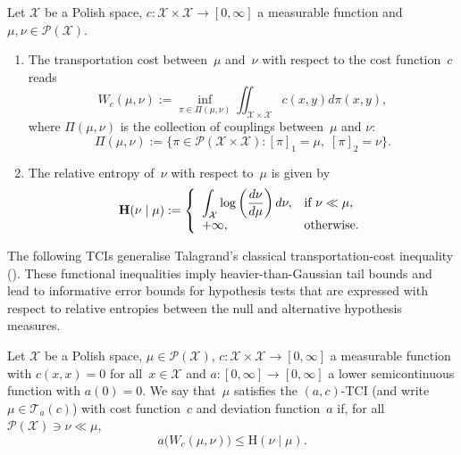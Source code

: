 \documentclass[twoside,11pt]{article}
\numberwithin{equation}{section}
\numberwithin{theorem}{section}
\newcommand{\Hent}{\boldsymbol{\mathrm{H}}}
\begin{document}
\begin{definition}\label{dfn:Wasserstein} Let $\mathcal{X}$ be a Polish space, 
$c:\mathcal{X}\times\mathcal{X}\rightarrow [0,\infty]$ a measurable function 
and $\mu, \nu\in\mathscr{P}(\mathcal{X})$. 
\begin{enumerate}
\item The transportation cost between~$\mu$ and~$\nu$ with respect to the cost function~$c$ reads
$$
W_{c}(\mu, \nu) :=\inf_{\pi\in\Pi(\mu,\nu)}\iint_{\mathcal{X}\times\mathcal{X}}c(x,y)d\pi(x,y),
$$
where $\Pi(\mu,\nu)$ is the collection of couplings between~$\mu$ and $\nu$:
$$
\Pi(\mu,\nu):=\bigg\{\pi\in\mathscr{P}(\mathcal{X}\times\mathcal{X}): [\pi]_1=\mu,\;[\pi]_2=\nu \bigg\}.
 $$
\item The relative entropy of~$\nu$ with respect to~$\mu$ is given by
\begin{equation*}
	\Hent(\nu\;|\; \mu) :=
 \left\{
 \begin{array}{ll}
	\displaystyle
	\large \int_{\mathcal{X}}\log\left(\frac{d\nu}{d\mu}\right)d\nu, & \text{if }\nu\ll\mu,\\
 +\infty, & \text{otherwise}.
\end{array}
\right.
\end{equation*}
\end{enumerate}
\end{definition}


The following TCIs generalise Talagrand's classical transportation-cost inequality (\cite{talagrand1996transportation}). These functional inequalities imply heavier-than-Gaussian tail bounds and lead to informative error bounds for hypothesis tests that are expressed with respect to relative entropies between the null and alternative hypothesis measures.


\begin{definition}\label{def:TCI} 
Let $\mathcal{X}$ be a Polish space,   $\mu\in\mathscr{P}(\mathcal{X})$,  $c:\mathcal{X}\times\mathcal{X}\rightarrow[0,\infty]$ a measurable function with $c(x,x)=0$ for all~$x\in\mathcal{X}$ and $a:[0,\infty]\rightarrow[0,\infty]$ a lower semicontinuous function with $a(0)=0$.
We say that~$\mu$ satisfies the $(a, c)$-TCI (and write $\mu\in\mathscr{T}_{a}(c)$) with cost function~$c$ and deviation function~$a$ if, 
for all $\mathscr{P}(\mathcal{X})\ni\nu\ll\mu$,
\begin{equation}\label{alphap}
a\bigg(W_c(\mu, \nu)\bigg)\leq \Hent(\nu\;|\; \mu).
\end{equation}
\end{definition}
\end{document}
